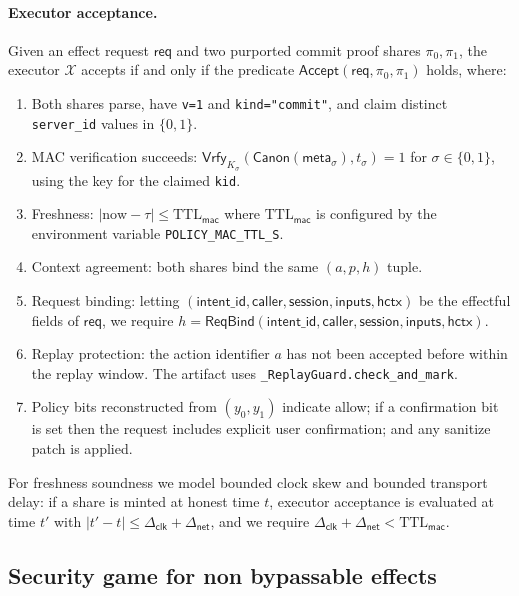 \paragraph{Executor acceptance.}
Given an effect request $\mathsf{req}$ and two purported commit proof shares $\pi_0,\pi_1$, the
executor $\mathcal{X}$ accepts if and only if the predicate $\mathsf{Accept}(\mathsf{req},\pi_0,\pi_1)$
holds, where:
\begin{enumerate}
\item Both shares parse, have \texttt{v=1} and \texttt{kind="commit"}, and claim distinct
\texttt{server\_id} values in $\{0,1\}$.
\item MAC verification succeeds:
$\mathsf{Vrfy}_{K_\sigma}(\mathsf{Canon}(\mathsf{meta}_\sigma), t_\sigma)=1$ for $\sigma\in\{0,1\}$,
using the key for the claimed \texttt{kid}.
\item Freshness: $\lvert \mathrm{now} - \tau\rvert \leq \mathrm{TTL}_{\mathsf{mac}}$
where $\mathrm{TTL}_{\mathsf{mac}}$ is configured by the environment variable \texttt{POLICY\_MAC\_TTL\_S}.
\item Context agreement: both shares bind the same $(a,p,h)$ tuple.
\item Request binding: letting $(\mathsf{intent\_id},\mathsf{caller},\mathsf{session},\mathsf{inputs},\mathsf{hctx})$
be the effectful fields of $\mathsf{req}$, we require $h =
\mathsf{ReqBind}(\mathsf{intent\_id},\mathsf{caller},\mathsf{session},\mathsf{inputs},\mathsf{hctx})$.
\item Replay protection: the action identifier $a$ has not been accepted before within the replay
window. The artifact uses \texttt{\_ReplayGuard.check\_and\_mark}.
\item Policy bits reconstructed from $(y_0,y_1)$ indicate allow; if a confirmation bit is set then
the request includes explicit user confirmation; and any sanitize patch is applied.
\end{enumerate}

For freshness soundness we model bounded clock skew and bounded transport delay: if a share is minted
at honest time $t$, executor acceptance is evaluated at time $t'$ with
$|t'-t|\leq \Delta_{\mathsf{clk}}+\Delta_{\mathsf{net}}$, and we require
$\Delta_{\mathsf{clk}}+\Delta_{\mathsf{net}}<\mathrm{TTL}_{\mathsf{mac}}$.

\subsection{Security game for non bypassable effects}
\label{app:proofs:nbe-game}

